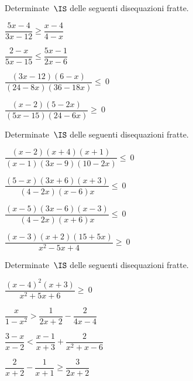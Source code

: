 \begin{esercizio}[\Ast]
\label{ese:21.59}
Determinate~\(\IS\) delle seguenti disequazioni fratte.
\begin{multicols}{2}
\begin{enumeratea}
\spazielenx
 \item \(\dfrac{5x-4}{3x-12}\ge \dfrac{x-4}{4-x}\)
\item \(\dfrac{2-x}{5x-15}\le \dfrac{5x-1}{2x-6}\)
\item \(\dfrac{(3x-12)(6-x)}{(24-8x)(36-18x)}\leqslant~0\)
\item \(\dfrac{(x-2)(5-2x)}{(5x-15)(24-6x)}\geqslant~0\)
\end{enumeratea}
\end{multicols}
\end{esercizio}


\begin{esercizio}[\Ast]
\label{ese:21.60}
Determinate~\(\IS\) delle seguenti disequazioni fratte.
\begin{multicols}{2}
\begin{enumeratea}
\spazielenx
\item \(\dfrac{(x-2)(x+4)(x+1)}{(x-1)(3x-9)(10-2x)}\leqslant~0\)
\item \(\dfrac{(5-x)(3x+6)(x+3)}{(4-2x)(x-6)x}\leqslant~0\)
\item \(\dfrac{(x-5)(3x-6)(x-3)}{(4-2x)(x+6)x}\leqslant~0\)
\item \(\dfrac{(x-3)(x+2)(15+5x)}{x^{2}-5x+4}\geqslant~0\)
\end{enumeratea}
\end{multicols}
\end{esercizio}

\begin{esercizio}[\Ast]
\label{ese:21.61}
Determinate~\(\IS\) delle seguenti disequazioni fratte.
\begin{multicols}{2}
\begin{enumeratea}
\spazielenx
\item \(\dfrac{\left(x-4\right)^{2}(x+3)}{x^{2}+5x+6}\geqslant~0\)
\item \(\dfrac{x}{1-x^{2}}>\dfrac{1}{2x+2}-\dfrac{2}{4x-4}\)
\item \(\dfrac{3-x}{x-2}<\dfrac{x-1}{x+3}+\dfrac{2}{x^{2}+x-6}\)
\item \(\dfrac{2}{x+2}-\dfrac{1}{x+1}\ge \dfrac{3}{2x+2}\)
\end{enumeratea}
\end{multicols}
\end{esercizio}

